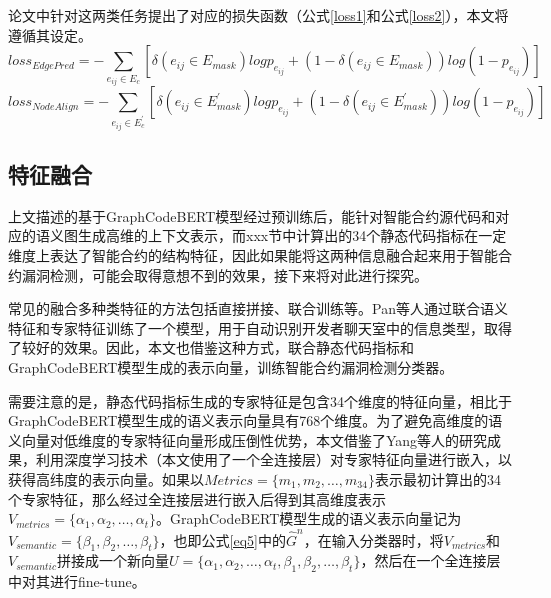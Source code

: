 论文\cite{guo2020graphcodebert}中针对这两类任务提出了对应的损失函数（公式\eqref{loss1}和公式\eqref{loss2}），本文将遵循其设定。
\begin{equation}
loss_{EdgePred}=-\sum_{e_{ij}\in E_{c}}[\delta(e_{ij}\in E_{mask})logp_{e_{ij}}+(1-\delta(e_{ij}\in E_{mask}))log(1-p_{e_{ij}})] \label{loss1}
\end{equation}
\begin{equation}
loss_{NodeAlign}=-\sum_{e_{ij}\in E_{c}^{'}}[\delta(e_{ij}\in E_{mask}^{'})logp_{e_{ij}}+(1-\delta(e_{ij}\in E_{mask}^{'}))log(1-p_{e_{ij}})] \label{loss2}
\end{equation}


\subsection{特征融合}
\label{sec:特征融合}
上文描述的基于GraphCodeBERT模型经过预训练后，能针对智能合约源代码和对应的语义图生成高维的上下文表示，而xxx节中计算出的34个静态代码指标在一定维度上表达了智能合约的结构特征，因此如果能将这两种信息融合起来用于智能合约漏洞检测，可能会取得意想不到的效果，接下来将对此进行探究。

常见的融合多种类特征的方法包括直接拼接、联合训练等。Pan等人通过联合语义特征和专家特征训练了一个模型，用于自动识别开发者聊天室中的信息类型，取得了较好的效果。因此，本文也借鉴这种方式，联合静态代码指标和GraphCodeBERT模型生成的表示向量，训练智能合约漏洞检测分类器。

需要注意的是，静态代码指标生成的专家特征是包含34个维度的特征向量，相比于GraphCodeBERT模型生成的语义表示向量具有768个维度。为了避免高维度的语义向量对低维度的专家特征向量形成压倒性优势，本文借鉴了Yang等人的研究成果，利用深度学习技术（本文使用了一个全连接层）对专家特征向量进行嵌入，以获得高纬度的表示向量。如果以$Metrics=\{m_1,m_2,\ldots,m_{34}\}$表示最初计算出的34个专家特征，那么经过全连接层进行嵌入后得到其高维度表示$V_{metrics}=\{\alpha_1,\alpha_2,\ldots,\alpha_t\}$。GraphCodeBERT模型生成的语义表示向量记为$V_{semantic}=\{\beta_1,\beta_2,\ldots,\beta_t\}$，也即公式\eqref{eq5}中的$\hat{G}^n$，在输入分类器时，将$V_{metrics}$和$V_{semantic}$拼接成一个新向量$U=\{\alpha_1,\alpha_2,\ldots,\alpha_t,\beta_1,\beta_2,\ldots,\beta_t\}$，然后在一个全连接层中对其进行fine-tune。

